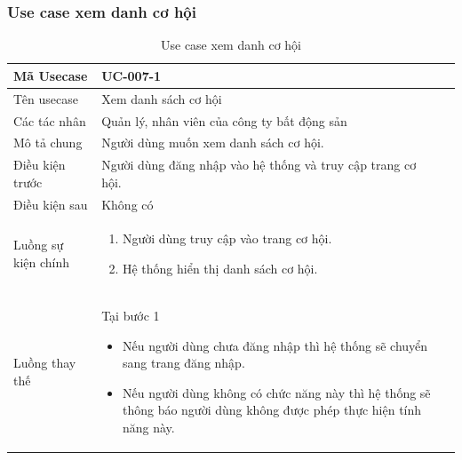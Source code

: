 \documentclass[12pt,a4paper]{article}
\begin{document}
    \subsubsection*{Use case xem danh cơ hội }
    \begin{table}[H]
        \centering
        \begin{tabular}{|p{3.5cm}|p{11.5cm}|c|}
            \hline
            Mã Usecase      & UC-007-1                                                    \\
            \hline
            Tên usecase     & Xem danh sách cơ hội                                        \\
            \hline
            Các tác nhân    & Quản lý, nhân viên của công ty bất động sản                 \\
            \hline
            Mô tả chung     & Người dùng muốn xem danh sách cơ hội.                       \\
            \hline

            Điều kiện trước & Người dùng đăng nhập vào hệ thống và truy cập trang cơ hội. \\
            \hline

            Điều kiện sau   & Không có                                                    \\
            \hline

            Luồng sự kiện chính & \vspace{-.8cm}\begin{enumerate}
                                                    \item Người dùng truy cập vào trang cơ hội.
                                                    \item Hệ thống hiển thị danh sách cơ hội.
            \end{enumerate}
            \\
            \hline
            Luồng thay thế & Tại bước 1\newline
            \vspace{-.8cm}\begin{itemize}
                              \item Nếu người dùng chưa đăng nhập thì hệ thống sẽ chuyển sang trang đăng nhập.
                              \item  Nếu người dùng không có chức năng này thì hệ thống sẽ thông báo người dùng không được phép thực hiện tính năng này.
            \end{itemize}

            \\    \hline
        \end{tabular}
        \caption{Use case xem danh cơ hội }
    \end{table}
\end{document}
